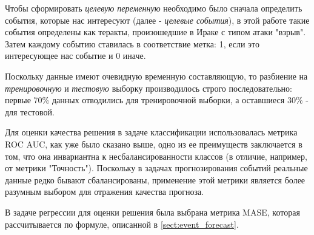 Чтобы сформировать \textit{целевую переменную} необходимо было сначала определить события, которые нас интересуют (далее - \textit{целевые события}), в этой работе такие события определены как теракты, произошедшие в Ираке с типом атаки "взрыв". Затем каждому событию ставилась в соответствие метка: 1, если это интересующее нас событие и 0 иначе. 

Поскольку данные имеют очевидную временную составляющую, то разбиение на \textit{тренировочную} и \textit{тестовую} выборку производилось строго последовательно: первые 70\% данных отводились для тренировочной выборки, а оставшиеся 30\% - для тестовой.

Для оценки качества решения в задаче классификации использовалась метрика ROC AUC, как уже было сказано выше, одно из ее преимуществ заключается в том, что она инвариантна к несбалансированности классов (в отличие, например, от метрики "Точность"). Поскольку в задачах прогнозирования событий реальные данные редко бывают сбалансированы, применение этой метрики является более разумным выбором для отражения качества прогноза.

В задаче регрессии для оценки решения была выбрана метрика MASE, которая рассчитывается по формуле, описанной в \ref{sect:event_forecast}.

